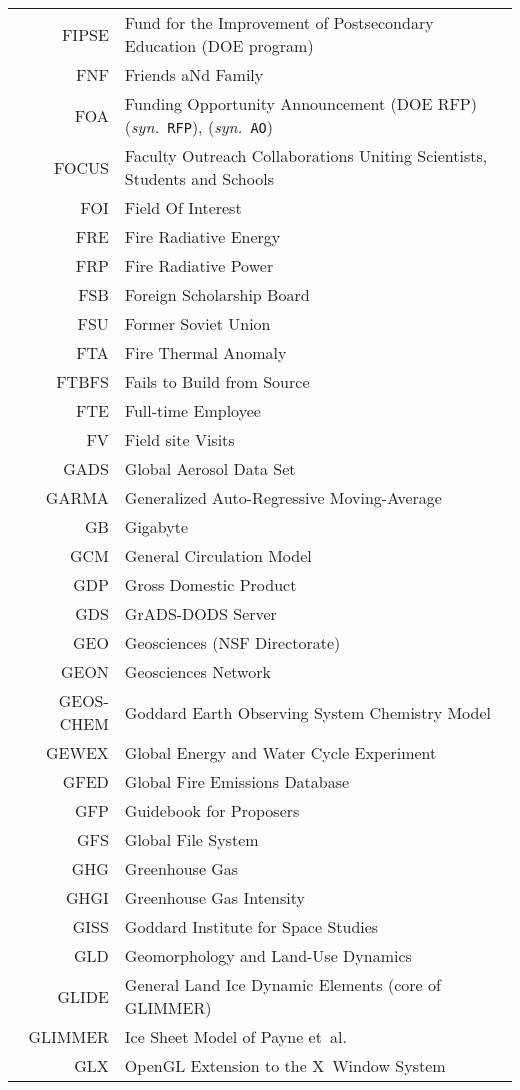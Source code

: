 \documentclass[12pt,twoside]{article}
\newcommand{\syn}[1]{(\textit{syn.}~\texttt{#1})}
\begin{document}
\begin{longtable}[>{\bfseries}l]{>{\ttfamily}r l}
FIPSE & Fund for the Improvement of Postsecondary Education (DOE program) \\
FNF & Friends aNd Family \\
FOA & Funding Opportunity Announcement (DOE RFP) \syn{RFP}, \syn{AO} \\
FOCUS & Faculty Outreach Collaborations Uniting Scientists, Students and Schools \\
FOI & Field Of Interest \\
FRE & Fire Radiative Energy \\
FRP & Fire Radiative Power \\
FSB & Foreign Scholarship Board \\
FSU & Former Soviet Union \\
FTA & Fire Thermal Anomaly \\
FTBFS & Fails to Build from Source \\
FTE & Full-time Employee \\
FV & Field site Visits \\
GADS & Global Aerosol Data Set \\
GARMA & Generalized Auto-Regressive Moving-Average \\
GB & Gigabyte \\
GCM & General Circulation Model \\
GDP & Gross Domestic Product \\
GDS & GrADS-DODS Server \\
GEO & Geosciences (NSF Directorate) \\
GEON & Geosciences Network \\
GEOS-CHEM & Goddard Earth Observing System Chemistry Model \\
GEWEX & Global Energy and Water Cycle Experiment \\
GFED & Global Fire Emissions Database \\
GFP & Guidebook for Proposers \\
GFS & Global File System \\
GHG & Greenhouse Gas \\
GHGI & Greenhouse Gas Intensity \\
GISS & Goddard Institute for Space Studies \\
GLD & Geomorphology and Land-Use Dynamics \\
GLIDE & General Land Ice Dynamic Elements (core of GLIMMER) \\
GLIMMER & Ice Sheet Model of Payne et~al. \\
GLX & OpenGL Extension to the X~Window System \\

\end{longtable}
\end{document}
